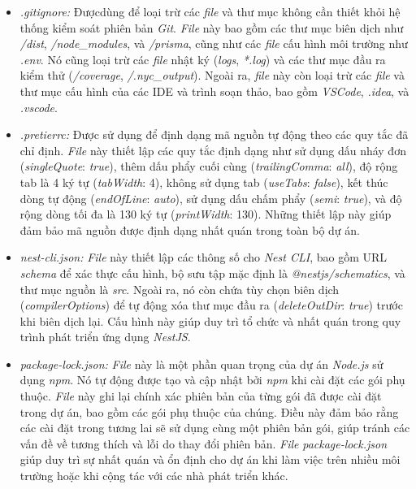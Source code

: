 \begin{itemize}
    \item \textit{.gitignore:} Đượcdùng để loại trừ các \textit{file} và thư mục không cần thiết khỏi hệ thống kiểm soát phiên bản \textit{Git}. \textit{File} này bao gồm các thư mục biên dịch như \textit{/dist}, \textit{/node\_modules}, và \textit{/prisma}, cũng như các \textit{file} cấu hình môi trường như \textit{.env}. Nó cũng loại trừ các \textit{file} nhật ký (\textit{logs}, \textit{*.log}) và các thư mục đầu ra kiểm thử (\textit{/coverage}, \textit{/.nyc\_output}). Ngoài ra, \textit{file} này còn loại trừ các \textit{file} và thư mục cấu hình của các IDE và trình soạn thảo, bao gồm \textit{VSCode}, \textit{.idea}, và \textit{.vscode}.
    \item \textit{.pretierrc:} Được sử dụng để định dạng mã nguồn tự động theo các quy tắc đã chỉ định. \textit{File} này thiết lập các quy tắc định dạng như sử dụng dấu nháy đơn (\textit{singleQuote}: \textit{true}), thêm dấu phẩy cuối cùng (\textit{trailingComma}: \textit{all}), độ rộng tab là 4 ký tự (\textit{tabWidth}: 4), không sử dụng tab (\textit{useTabs}: \textit{false}), kết thúc dòng tự động (\textit{endOfLine}: \textit{auto}), sử dụng dấu chấm phẩy (\textit{semi}: \textit{true}), và độ rộng dòng tối đa là 130 ký tự (\textit{printWidth}: 130). Những thiết lập này giúp đảm bảo mã nguồn được định dạng nhất quán trong toàn bộ dự án.
    \item \textit{nest-cli.json:} \textit{File} này thiết lập các thông số cho \textit{Nest CLI}, bao gồm URL \textit{schema} để xác thực cấu hình, bộ sưu tập mặc định là \textit{@nestjs/schematics}, và thư mục nguồn là \textit{src}. Ngoài ra, nó còn chứa tùy chọn biên dịch (\textit{compilerOptions}) để tự động xóa thư mục đầu ra (\textit{deleteOutDir}: \textit{true}) trước khi biên dịch lại. Cấu hình này giúp duy trì tổ chức và nhất quán trong quy trình phát triển ứng dụng \textit{NestJS}.
    \item \textit{package-lock.json:} \textit{File} này là một phần quan trọng của dự án \textit{Node.js} sử dụng \textit{npm}. Nó tự động được tạo và cập nhật bởi \textit{npm} khi cài đặt các gói phụ thuộc. \textit{File} này ghi lại chính xác phiên bản của từng gói đã được cài đặt trong dự án, bao gồm các gói phụ thuộc của chúng. Điều này đảm bảo rằng các cài đặt trong tương lai sẽ sử dụng cùng một phiên bản gói, giúp tránh các vấn đề về tương thích và lỗi do thay đổi phiên bản. \textit{File} \textit{package-lock.json} giúp duy trì sự nhất quán và ổn định cho dự án khi làm việc trên nhiều môi trường hoặc khi cộng tác với các nhà phát triển khác.

\end{itemize}
